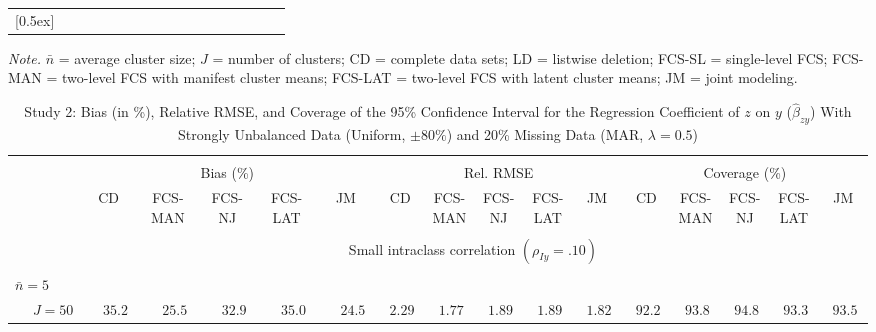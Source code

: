 \begin{sidewaystable}
\begin{threeparttable}
\begin{tabular}{llccccccccccccccc}
[0.5ex]\hline\\[-1.6ex] 
\end{tabular}
\begin{tablenotes}{\footnotesize \textit{Note.} $\bar{n}$ = average cluster size; $J$ = number of clusters; CD = complete data sets; LD = listwise deletion; FCS-SL = single-level FCS; FCS-MAN = two-level FCS with manifest cluster means; FCS-LAT = two-level FCS with latent cluster means; JM = joint modeling.}\end{tablenotes}
\end{threeparttable}
\end{sidewaystable}
\begin{sidewaystable}
\begin{threeparttable}
\setlength{\tabcolsep}{1.0pt}
\renewcommand{\arraystretch}{0.95}
\footnotesize
\caption{\small Study 2: Bias (in \%), Relative RMSE, and Coverage of the 95\% Confidence Interval for the Regression Coefficient of $z$ on $y$ ($\hat\beta_{zy}$) With Strongly Unbalanced Data (Uniform, $\pm 80\%$) and 20\% Missing Data (MAR, $\lambda=0.5$)}
\begin{tabular}{llccccccccccccccc}
\hline\\[-1.8ex]
& & \multicolumn{5}{c}{Bias (\%)} & \multicolumn{5}{c}{Rel. RMSE} & \multicolumn{5}{c}{Coverage (\%)} \\ \cmidrule(r){3-7}\cmidrule(r){8-12}\cmidrule(r){13-17}
 &  & CD & \makecell{FCS-\\MAN} & \makecell{FCS-\\NJ} & \makecell{FCS-\\LAT} & JM & CD & \makecell{FCS-\\MAN} & \makecell{FCS-\\NJ} & \makecell{FCS-\\LAT} & JM & CD & \makecell{FCS-\\MAN} & \makecell{FCS-\\NJ} & \makecell{FCS-\\LAT} & \multicolumn{1}{c}{JM} \\ 
[0.4ex]\hline\\[-1.8ex]
& & \multicolumn{15}{c}{Small intraclass correlation $(\rho_{Iy}=.10)$} \\[0.6ex]\hline\\[-1.8ex]
\multicolumn{4}{l}{$\bar{n}=5$} \\  & \nopagebreak $\;J=50$  & $\phantom{-}35.2\phantom{0}$ & $\phantom{-}25.5\phantom{0}$ & $\phantom{-}32.9\phantom{0}$ & $\phantom{-}35.0\phantom{0}$ & $\phantom{-}24.5\phantom{0}$ & $\phantom{0}2.29\phantom{0}$ & $\phantom{0}1.77\phantom{0}$ & $\phantom{0}1.89\phantom{0}$ & $\phantom{0}1.89\phantom{0}$ & $\phantom{0}1.82\phantom{0}$ & $\phantom{0}92.2\phantom{0}$ & $\phantom{0}93.8\phantom{0}$ & $\phantom{0}94.8\phantom{0}$ & $\phantom{0}93.3\phantom{0}$ & $\phantom{0}93.5\phantom{0}$ \\

\end{tabular}
\end{threeparttable}
\end{sidewaystable}
